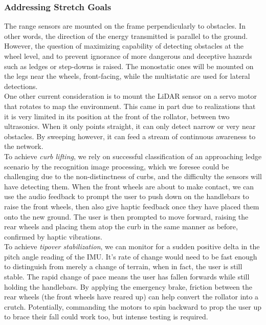 \subsubsection{Addressing Stretch Goals}
\noindent The range sensors are mounted on the frame perpendicularly to obstacles. In other words, the direction of the energy transmitted is parallel to the ground. However, the question of maximizing capability of detecting obstacles at the wheel level, and to prevent ignorance of more dangerous and deceptive hazards such as ledges or step-downs is raised. The monostatic ones will be mounted on the legs near the wheels, front-facing, while the multistatic are used for lateral detections.\\

\noindent One other current consideration is to mount the LiDAR sensor on a servo motor that rotates to map the environment. This came in part due to realizations that it is very limited in its position at the front of the rollator, between two ultrasonics. When it only points straight, it can only detect narrow or very near obstacles. By sweeping however, it can feed a stream of continuous awareness to the network.\\

\noindent To achieve \textit{curb lifting}, we rely on successful classification of an approaching ledge scenario by the recognition image processing, which we foresee could be challenging due to the non-distinctness of curbs, and the difficulty the sensors will have detecting them. When the front wheels are about to make contact, we can use the audio feedback to prompt the user to push down on the handlebars to raise the front wheels, then also give haptic feedback once they have placed them onto the new ground. The user is then prompted to move forward, raising the rear wheels and placing them atop the curb in the same manner as before, confirmed by haptic vibrations.\\

\noindent To achieve \textit{tipover stabilization}, we can monitor for a sudden positive delta in the pitch angle reading of the IMU. It's rate of change would need to be fast enough to distinguish from merely a change of terrain, when in fact, the user is still stable. The rapid change of pace means the user has fallen forwards while still holding the handlebars. By applying the emergency brake, friction between the rear wheels (the front wheels have reared up) can help convert the rollator into a crutch. Potentially, commanding the motors to spin backward to prop the user up to brace their fall could work too, but intense testing is required.\\

